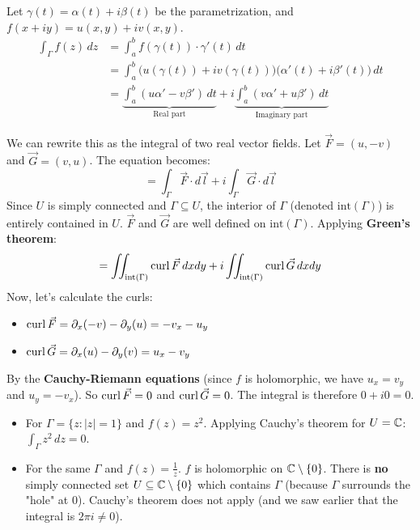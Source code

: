 \begin{proofbox}
Let $\gamma(t) = \alpha(t) + i\beta(t)$ be the parametrization, and $f(x+iy) = u(x,y) + i v(x,y)$.
\begin{align*}
\int_{\Gamma} f(z) \, dz &= \int_a^b f(\gamma(t)) \cdot \gamma'(t) \, dt \\
&= \int_a^b \Big(u(\gamma(t)) + i v(\gamma(t))\Big) \Big(\alpha'(t) + i\beta'(t)\Big) \, dt \\
&= \underbrace{\int_a^b (u \alpha' - v \beta') \, dt}_{\text{Real part}} + i \underbrace{\int_a^b (v \alpha' + u \beta') \, dt}_{\text{Imaginary part}}
\end{align*}

We can rewrite this as the integral of two real vector fields. Let $\vec{F} = (u, -v)$ and $\vec{G} = (v, u)$. The equation becomes:
\[
= \int_{\Gamma} \vec{F} \cdot d\vec{l} + i \int_{\Gamma} \vec{G} \cdot d\vec{l}
\]
Since $U$ is simply connected and $\Gamma \subseteq U$, the interior of $\Gamma$ (denoted $\text{int}(\Gamma)$) is entirely contained in $U$. $\vec{F}$ and $\vec{G}$ are well defined on $\text{int}(\Gamma)$. Applying \textbf{Green's theorem}:
\[
= \iint_{\text{int}(\Gamma)} \operatorname{curl} \vec{F} \, dxdy + i \iint_{\text{int}(\Gamma)} \operatorname{curl} \vec{G} \, dxdy
\]
Now, let's calculate the curls:
\begin{itemize}
    \item $\operatorname{curl} \vec{F} = \partial_x(-v) - \partial_y(u) = -v_x - u_y$
    \item $\operatorname{curl} \vec{G} = \partial_x(u) - \partial_y(v) = u_x - v_y$
\end{itemize}
By the \textbf{Cauchy-Riemann equations} (since $f$ is holomorphic, we have $u_x = v_y$ and $u_y = -v_x$). So $\operatorname{curl} \vec{F} = 0$ and $\operatorname{curl} \vec{G} = 0$.
The integral is therefore $0 + i0 = 0$.
\end{proofbox}

\begin{example}[Examples]
\begin{itemize}
    \item For $\Gamma = \{z : |z| = 1\}$ and $f(z) = z^2$. Applying Cauchy's theorem for $U=\mathbb{C}$: $\int_{\Gamma} z^2 \, dz = 0$.
    \item For the same $\Gamma$ and $f(z) = \frac{1}{z}$. $f$ is holomorphic on $\mathbb{C} \setminus \{0\}$. There is \textbf{no} simply connected set $U \subseteq \mathbb{C} \setminus \{0\}$ which contains $\Gamma$ (because $\Gamma$ surrounds the "hole" at $0$). Cauchy's theorem does not apply (and we saw earlier that the integral is $2\pi i \neq 0$).
\end{itemize}
\end{example}

